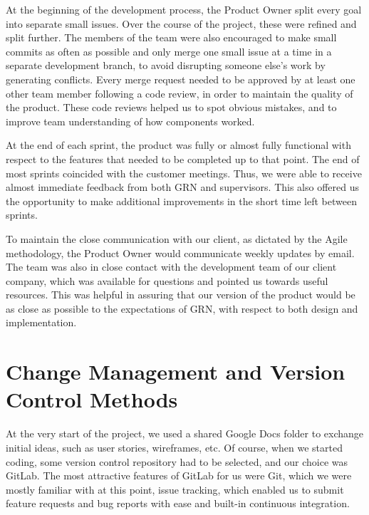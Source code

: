 \documentclass{l3proj}
\begin{document}
 

At the beginning of the development process, the Product Owner split
 every goal into separate small issues. Over the course of the project,
 these were refined and split further. The members of the team were
 also encouraged to make small commits as often as possible and only
 merge one small issue at a time in a separate development branch,
 to avoid disrupting someone else's work by generating conflicts.
 Every merge request needed to be approved by at least one other
 team member following a code review, in order to maintain the quality
 of the product. These code reviews helped us to spot obvious mistakes,
 and to improve team understanding of how components worked.

At the end of each sprint, the product was fully or almost fully
 functional with respect to the features that needed to be completed
 up to that point. The end of most sprints coincided with the customer
 meetings. Thus, we were able to receive almost immediate feedback
 from both GRN and supervisors. This also offered us the opportunity
 to make additional improvements in the short time left between sprints.

To maintain the close communication with our client, as dictated by
 the Agile methodology, the Product Owner would communicate weekly
 updates by email. The team was also in close contact with the
 development team of our client company, which was available
 for questions and pointed us towards useful resources. This
 was helpful in assuring that our version of the product would
 be as close as possible to the expectations of GRN, with respect
 to both design and implementation.

\section{Change Management and Version Control Methods}
\label{sec:changemgmt}

At the very start of the project, we used a shared Google Docs folder
 to exchange initial ideas, such as user stories, wireframes, etc.
 Of course, when we started coding, some version control
 repository had to be selected, and our choice was GitLab.
 The most attractive features of GitLab for us were
 Git, which we were mostly familiar with at this point, issue
 tracking, which enabled us to submit feature requests and bug reports
 with ease and built-in continuous integration.
\end{document}
